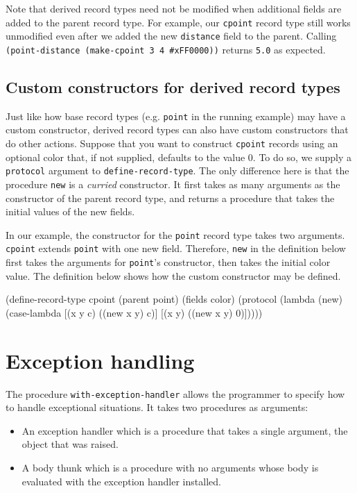 \documentclass[onecolumn, 12pt, twoside, openright, dvipdfm]{book}
\begin{document}
Note that derived record types need not be modified when additional
fields are added to the parent record type.  For example, our
\texttt{cpoint} record type still works unmodified even after we
added the new \texttt{distance} field to the parent.  
Calling \texttt{(point-distance (make-cpoint 3 4 \#xFF0000))}
returns \texttt{5.0} as expected.

\subsection{Custom constructors for derived record types}

Just like how base record types (e.g. \texttt{point} in the running
example) may have a custom constructor, derived record types can
also have custom constructors that do other actions.  Suppose that
you want to construct \texttt{cpoint} records using an optional
color that, if not supplied, defaults to the value 0.  To do so, we
supply a \texttt{protocol} argument to \texttt{define-record-type}.
The only difference here is that the procedure \texttt{new} is a
\emph{curried} constructor.  It first takes as many arguments as the
constructor of the parent record type, and returns a procedure that
takes the initial values of the new fields.  

In our example, the constructor for the \texttt{point} record type
takes two arguments.  \texttt{cpoint} extends \texttt{point} with
one new field.  Therefore, \texttt{new} in the definition below
first takes the arguments for \texttt{point}'s constructor, then
takes the initial color value.  The definition below shows how the
custom constructor may be defined.

\newpage
\begin{CodeInline}
(define-record-type cpoint
  (parent point) 
  (fields color) 
  (protocol
    (lambda (new) 
      (case-lambda 
        [(x y c) ((new x y) c)]
        [(x y)   ((new x y) 0)]))))
\end{CodeInline}


\section{Exception handling}

The procedure \texttt{with-exception-handler} allows the programmer
to specify how to handle exceptional situations.  It takes two
procedures as arguments: 
\begin{itemize}
\item An exception handler which is a procedure that takes a
single argument, the object that was raised.
\item A body thunk which is a procedure with no arguments whose body
is evaluated with the exception handler installed.
\end{itemize}
\end{document}

